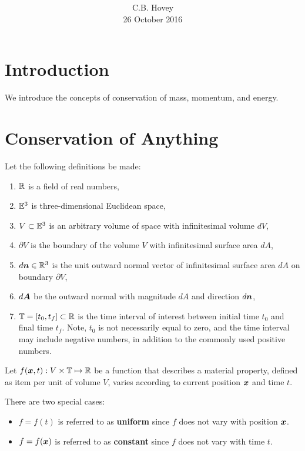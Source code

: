 \documentclass[10pt,reqno]{amsart}
\title{\bfseries \cbhTitle}
\author{C.B. Hovey \\ \tiny 26 October 2016}
\newcommand{\bbT}{\mathbb{T}}
\begin{document}

\maketitle


\section{Introduction}
We introduce the concepts of conservation of mass, momentum, and energy.

\section{Conservation of Anything}
Let the following definitions be made:
\begin{enumerate}
 \item $\mathbb{R}$ is a field of real numbers,
 \item $\mathbb{E}^3$ is three-dimensional Euclidean space,
 \item $V \subset \mathbb{E}^3$ is an arbitrary volume of space with 
 infinitesimal volume $dV$,
 \item $\partial V$ is the boundary of the volume $V$ with infinitesimal
 surface area $dA$,
 \item $d\mbox{\boldmath $n$} \in \mathbb{R}^3$ is the unit outward normal vector 
 of infinitesimal surface area $dA$ on boundary $\partial V$,
 \item $d\mbox{\boldmath $A$}$ be the outward normal with magnitude $dA$ and direction 
 $d\mbox{\boldmath $n$}$,
 \item $\bbT = [t_0, t_f] \subset \real$ is the time interval of interest
 between initial time $t_0$ and final time $t_f$.  Note, $t_0$ is not 
 necessarily equal to zero, and the time interval may include negative 
 numbers, in addition to the commonly used positive numbers.  
\end{enumerate}

Let $f(\vx,t): V \times \bbT \mapsto \real$ 
be a function that describes a material property,
defined as item per unit of volume $V$, 
varies according to current position $\mbox{\boldmath $x$}$ and time $t$.

There are two special cases:
\begin{itemize}
 \item $f = f(t)$ is referred to as {\bf uniform} since $f$ does not
 vary with position $\mbox{\boldmath $x$}$.  
 \item $f = f(\mbox{\boldmath $x$})$ is referred to as {\bf constant} since $f$ does not 
 vary with time $t$.  
\end{itemize}
\end{document}
